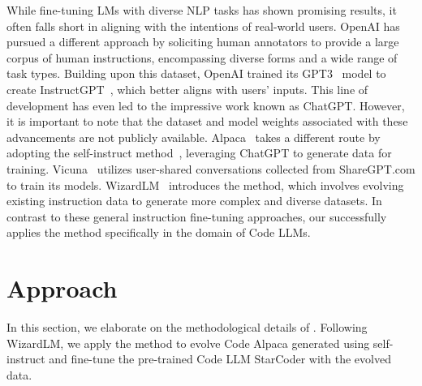 While fine-tuning LMs with diverse NLP tasks has shown promising results, it often falls short in aligning with the intentions of real-world users. OpenAI has pursued a different approach by soliciting human annotators to provide a large corpus of human instructions, encompassing diverse forms and a wide range of task types. Building upon this dataset, OpenAI trained its GPT3~\cite{GPT3} model to create InstructGPT~\cite{DBLP:conf/nips/Ouyang0JAWMZASR22}, which better aligns with users' inputs. This line of development has even led to the impressive work known as ChatGPT. However, it is important to note that the dataset and model weights associated with these advancements are not publicly available. Alpaca~\cite{alpaca} takes a different route by adopting the self-instruct method~\cite{wang2022self}, leveraging ChatGPT to generate data for training. Vicuna~\cite{vicuna2023} utilizes user-shared conversations collected from ShareGPT.com to train its models. WizardLM~\cite{xu2023wizardlm} introduces the \name{} method, which involves evolving existing instruction data to generate more complex and diverse datasets. In contrast to these general instruction fine-tuning approaches, our \modelname{} successfully applies the \name{} method specifically in the domain of Code LLMs.\section{Approach}
In this section, we elaborate on the methodological details of \modelname{}. Following WizardLM, we apply the \name{} method to evolve Code Alpaca generated using self-instruct and fine-tune the pre-trained Code LLM StarCoder with the evolved data. 

